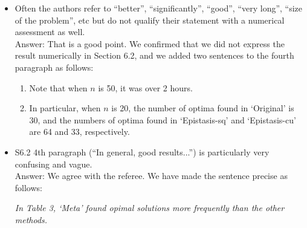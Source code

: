 \documentclass[a4paper]{article}
\newenvironment*{qna}{%
	\newcommand{\comment}{\item \sf}%
	\newcommand{\answer}{\medskip\\Answer: \rm}%
	\newcommand*{\quotehead}{\medskip\par\rm}%
	\newcommand*{\quotetail}{\par\it}%
	\newcommand{\quoteit}{\medskip\par\it}%
	\begin{itemize}%
	}{%
	\end{itemize}\normalfont%
}
\begin{document}
\begin{qna}
\comment
	Often the authors refer to ``better'', ``significantly'', ``good'', ``very
	long'', ``size of the problem'', etc but do not qualify their statement
	with a numerical assessment as well.
\answer
	That is a good point. We confirmed that we did not express the result numerically in Section 6.2, and we added two sentences to the fourth paragraph as follows:
\quoteit
	\begin{enumerate}[label=\alph*)]
	\item Note that when $ n $ is 50, it was over 2 hours.
	\item In particular, when $ n $ is 20, the number of optima found in `Original' is 30, and the numbers of optima found in `Epistasis-sq' and `Epistasis-cu' are 64 and 33, respectively.
	\end{enumerate}
\end{qna}

\begin{qna}
\comment
	S6.2 4th paragraph (``In general, good results...'') is particularly very
	confusing and vague.
\answer
	We agree with the referee. We have made the sentence precise as follows:
\quoteit
	In Table 3, `Meta' found opimal solutions more frequently than the other methods.
\end{qna}
\end{document}
